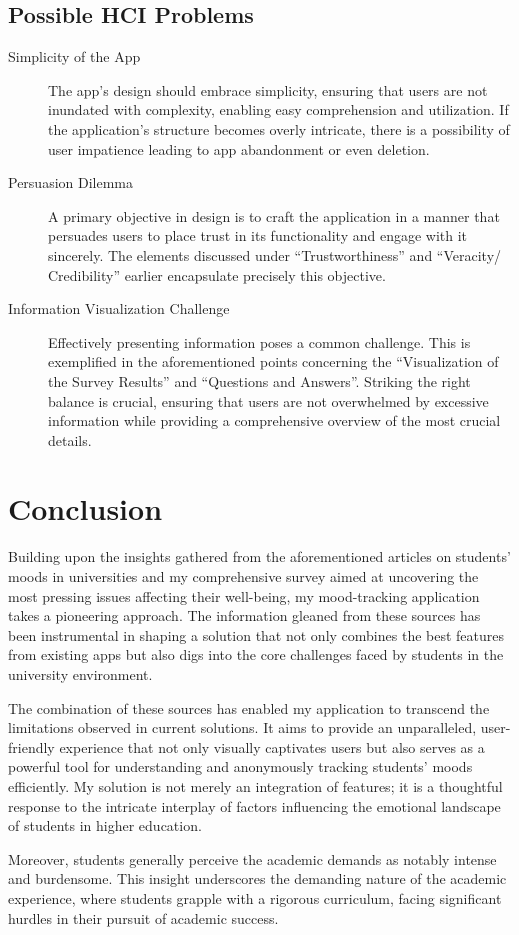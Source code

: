 \subsection{Possible HCI Problems}

\begin{description}
    
    \item[Simplicity of the App] The app's design should embrace simplicity, ensuring that users are not inundated with complexity, enabling easy comprehension and utilization. If the application's structure becomes overly intricate, there is a possibility of user impatience leading to app abandonment or even deletion.

    \item[Persuasion Dilemma] A primary objective in design is to craft the application in a manner that persuades users to place trust in its functionality and engage with it sincerely. The elements discussed under ``Trustworthiness'' and ``Veracity/ Credibility'' earlier encapsulate precisely this objective.

    \item[Information Visualization Challenge] Effectively presenting information poses a common challenge. This is exemplified in the aforementioned points concerning the ``Visualization of the Survey Results'' and ``Questions and Answers''. Striking the right balance is crucial, ensuring that users are not overwhelmed by excessive information while providing a comprehensive overview of the most crucial details.
    
\end{description}

\section{Conclusion}

Building upon the insights gathered from the aforementioned articles on students' moods in universities and my comprehensive survey aimed at uncovering the most pressing issues affecting their well-being, my mood-tracking application takes a pioneering approach. The information gleaned from these sources has been instrumental in shaping a solution that not only combines the best features from existing apps but also digs into the core challenges faced by students in the university environment.
\newline

The combination of these sources has enabled my application to transcend the limitations observed in current solutions. It aims to provide an unparalleled, user-friendly experience that not only visually captivates users but also serves as a powerful tool for understanding and anonymously tracking students' moods efficiently. My solution is not merely an integration of features; it is a thoughtful response to the intricate interplay of factors influencing the emotional landscape of students in higher education.
\newline

Moreover, students generally perceive the academic demands as notably intense and burdensome. This insight underscores the demanding nature of the academic experience, where students grapple with a rigorous curriculum, facing significant hurdles in their pursuit of academic success.